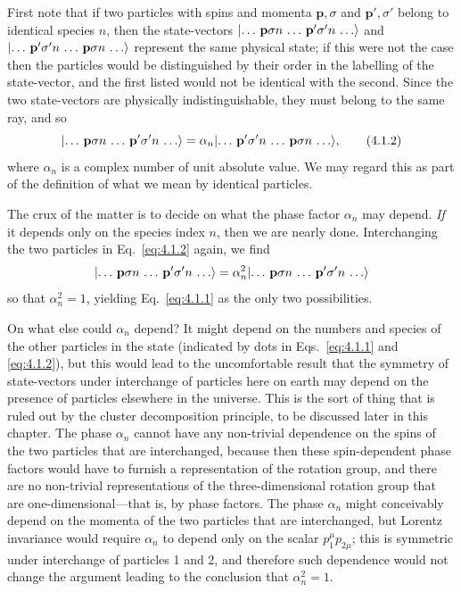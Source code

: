 First note that if two particles with spins and momenta $\mathbf p,\sigma$ and
$\mathbf p',\sigma'$ belong to identical species $n$, then the state-vectors
$\lvert \ldots\,\mathbf p\sigma n\,\ldots\,\mathbf p'\sigma'n\,\ldots\rangle$ and
$\lvert \ldots\,\mathbf p'\sigma'n\,\ldots\,\mathbf p\sigma n\,\ldots\rangle$ represent the same physical
state; if this were not the case then the particles would be distinguished by
their order in the labelling of the state-vector, and the first listed would not
be identical with the second. Since the two state-vectors are physically
indistinguishable, they must belong to the same ray, and so
\begin{equation}
  \lvert \ldots\,\mathbf p\sigma n\,\ldots\,\mathbf p'\sigma'n\,\ldots\rangle
  = \alpha_n\lvert \ldots\,\mathbf p'\sigma'n\,\ldots\,\mathbf p\sigma n\,\ldots\rangle,
  \tag{4.1.2}
  \label{eq:4.1.2}
\end{equation}
where $\alpha_n$ is a complex number of unit absolute value. We may regard this
as part of the definition of what we mean by identical particles.

The crux of the matter is to decide on what the phase factor $\alpha_n$ may
depend. \textit{If} it depends only on the species index $n$, then we are nearly done.
Interchanging the two particles in Eq.~\eqref{eq:4.1.2} again, we find
\[
  \lvert \ldots\,\mathbf p\sigma n\,\ldots\,\mathbf p'\sigma'n\,\ldots\rangle
  = \alpha_n^2\lvert \ldots\,\mathbf p\sigma n\,\ldots\,\mathbf p'\sigma'n\,\ldots\rangle
\]
so that $\alpha_n^2=1$, yielding Eq.~\eqref{eq:4.1.1} as the only two possibilities.

On what else could $\alpha_n$ depend? It might depend on the numbers
and species of the other particles in the state (indicated by dots in
Eqs.~\eqref{eq:4.1.1} and \eqref{eq:4.1.2}), but this would lead to the uncomfortable result
that the symmetry of state-vectors under interchange of particles here on
earth may depend on the presence of particles elsewhere in the universe.
This is the sort of thing that is ruled out by the cluster decomposition
principle, to be discussed later in this chapter. The phase $\alpha_n$ cannot
have any non-trivial dependence on the spins of the two particles that
are interchanged, because then these spin-dependent phase factors would
have to furnish a representation of the rotation group, and there are
no non-trivial representations of the three-dimensional rotation group
that are one-dimensional---that is, by phase factors. The phase $\alpha_n$
might conceivably depend on the momenta of the two particles that are
interchanged, but Lorentz invariance would require $\alpha_n$ to depend only on
the scalar $p_1^\mu p_{2\mu}$; this is symmetric under interchange of particles 1 and 2,
and therefore such dependence would not change the argument leading
to the conclusion that $\alpha_n^2=1$.

